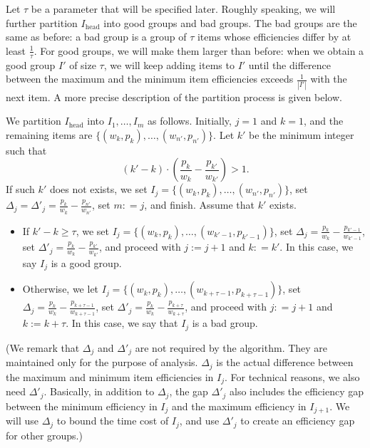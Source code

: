 \documentclass[a4paper,UKenglish,cleveref, autoref, thm-restate, pdfa]{lipics-v2021}
\renewcommand{\geq}{\geqslant}
\begin{document}
Let $\tau$ be a parameter that will be specified later. Roughly speaking, we will further partition $I_{\mathrm{head}}$ into good groups and bad groups. The bad groups are the same as before: a bad group is a group of $\tau$ items whose efficiencies differ by at least $\frac{1}{\tau}$. For good groups, we will make them larger than before: when we obtain a good group $I'$ of size $\tau$, we will keep adding items to $I'$ until the difference between the maximum and the minimum item efficiencies exceeds $\frac{1}{|I'|}$ with the next item. A more precise description of the partition process is given below. 

We partition $I_{\mathrm{head}}$ into $I_1, \ldots, I_m$ as follows. Initially, $j = 1$ and $k = 1$, and the remaining items are $\{(w_k, p_k), \ldots, (w_{n'}, p_{n'})\}$. Let $k'$ be the minimum integer such that
\[
    (k' - k) \cdot (\frac{p_k}{w_k} - \frac{p_{k'}}{w_{k'}}) > 1.
\]
If such $k'$ does not exists, we set $I_j = \{(w_k, p_k), \ldots, (w_{n'}, p_{n'})\}$, set $\Delta_j = \Delta'_j = \frac{p_k}{w_k} - \frac{p_{n'}}{w_{n'}}$, set $m: = j$, and finish. Assume that $k'$ exists. 
\begin{itemize}
    \item If $k' - k \geq \tau$, we set $I_j = \{(w_k, p_k), \ldots, (w_{k' - 1}, p_{k'-1})\}$, set $\Delta_j = \frac{p_k}{w_k} - \frac{p_{k'-1}}{w_{k'-1}}$, set $\Delta'_j = \frac{p_k}{w_k} - \frac{p_{k'}}{w_{k'}}$, and proceed with $j := j + 1$ and $k: = k'$. In this case, we say $I_j$ is a good group. 

    \item Otherwise, we let $I_j = \{(w_k, p_k), \ldots, (w_{k + \tau - 1}, p_{k + \tau - 1})\}$, set $\Delta_j = \frac{p_k}{w_k} - \frac{p_{k + \tau - 1}}{w_{k+\tau - 1}}$, set $\Delta'_j = \frac{p_k}{w_k} - \frac{p_{k + \tau}}{w_{k+\tau}}$, and proceed with $j: = j + 1$ and $k:= k + \tau$. In this case, we say that $I_j$ is a bad group. 
\end{itemize}
(We remark that $\Delta_j$ and $\Delta'_j$ are not required by the algorithm. They are maintained only for the purpose of analysis. $\Delta_j$ is the actual difference between the maximum and minimum item efficiencies in $I_j$. For technical reasons, we also need $\Delta'_j$. Basically, in addition to $\Delta_j$, the gap $\Delta'_j$ also includes the efficiency gap between the minimum efficiency in $I_j$ and the maximum efficiency in $I_{j+1}$. We will use $\Delta_j$ to bound the time cost of $I_j$, and use $\Delta'_j$ to create an efficiency gap for other groups.)
\end{document}
